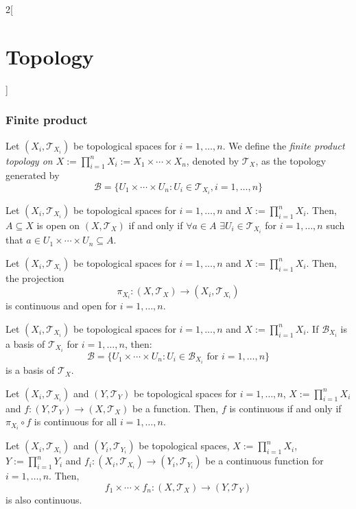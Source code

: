 \documentclass[../../../main.tex]{subfiles}
\begin{document}
\begin{multicols}{2}[\section{Topology}]
  \subsubsection{Finite product}
  \begin{definition}
    Let $(X_i,\mathcal{T}_{X_i})$ be topological spaces for $i=1,\ldots,n$. We define the \textit{finite product topology on $X:=\prod_{i=1}^nX_i:=X_1\times \cdots\times X_n$}, denoted by $\mathcal{T}_X$, as the topology generated by $$\mathcal{B}=\{U_1\times\cdots\times U_n :U_i\in\mathcal{T}_{X_i},i=1,\ldots,n\}$$
  \end{definition}
  \begin{prop}
    Let $(X_i,\mathcal{T}_{X_i})$ be topological spaces for $i=1,\ldots,n$ and $X:=\prod_{i=1}^nX_i$. Then, $A\subseteq X$ is open on $(X,\mathcal{T}_X)$ if and only if $\forall a\in A$ $\exists U_i\in\mathcal{T}_{X_i}$ for $i=1,\ldots,n$ such that $a\in U_1\times\cdots\times U_n\subseteq A$.
  \end{prop}
  \begin{prop}
    Let $(X_i,\mathcal{T}_{X_i})$ be topological spaces for $i=1,\ldots,n$ and $X:=\prod_{i=1}^nX_i$. Then, the projection $$\pi_{X_i}:\left(X,\mathcal{T}_X\right)\longrightarrow (X_i,\mathcal{T}_{X_i})$$
    is continuous and open for $i=1,\ldots,n$.
  \end{prop}
  \begin{prop}
    Let $(X_i,\mathcal{T}_{X_i})$ be topological spaces for $i=1,\ldots,n$ and $X:=\prod_{i=1}^nX_i$. If $\mathcal{B}_{X_i}$ is a basis of $\mathcal{T}_{X_i}$ for $i=1,\ldots,n$, then: $$\mathcal{B}=\{U_1\times\cdots\times U_n :U_i\in\mathcal{B}_{X_i}\text{ for }i=1,\ldots,n\}$$
    is a basis of $\mathcal{T}_X$.
  \end{prop}
  \begin{prop}
    Let $(X_i,\mathcal{T}_{X_i})$ and $(Y,\mathcal{T}_Y)$ be topological spaces for $i=1,\ldots,n$, $X:=\prod_{i=1}^nX_i$ and $f:(Y,\mathcal{T}_Y)\rightarrow(X,\mathcal{T}_X)$ be a function. Then, $f$ is continuous if and only if $\pi_{X_i}\circ f$ is continuous for all $i=1,\ldots,n$.
  \end{prop}
  \begin{prop}
    Let $(X_i,\mathcal{T}_{X_i})$ and $(Y_i,\mathcal{T}_{Y_i})$ be topological spaces, $X:=\prod_{i=1}^nX_i$, $Y:=\prod_{i=1}^nY_i$ and $f_i:(X_i,\mathcal{T}_{X_i})\rightarrow(Y_i,\mathcal{T}_{Y_i})$ be a continuous function for $i=1,\ldots,n$. Then, $$f_1\times\cdots\times f_n:\left(X,\mathcal{T}_X\right)\longrightarrow\left(Y,\mathcal{T}_Y\right)$$ is also continuous.

\end{prop}
\end{multicols}
\end{document}
